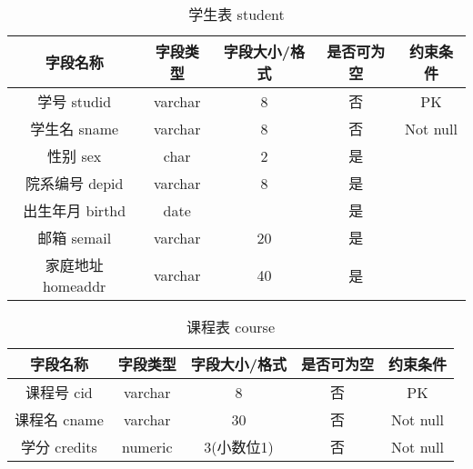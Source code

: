 \documentclass[a4paper]{uestcreport}
\begin{document}
\begin{table}[!h]
    \centering
    \caption{学生表 student}\label{tab:studentTable}%
    \begin{tabular}{|c|c|c|c|c|}
        \hline
        字段名称          & 字段类型 & 字段大小/格式 & 是否可为空 & 约束条件 \\
        \hline
        学号 studid       & varchar  & 8             & 否         & PK       \\
        \hline
        学生名 sname      & varchar  & 8             & 否         & Not null \\
        \hline
        性别 sex          & char     & 2             & 是         &          \\
        \hline
        院系编号 depid    & varchar  & 8             & 是         &          \\
        \hline
        出生年月 birthd   & date     &               & 是         &          \\
        \hline
        邮箱 semail       & varchar  & 20            & 是         &          \\
        \hline
        家庭地址 homeaddr & varchar  & 40            & 是         &          \\
        \hline
    \end{tabular}
\end{table}

\begin{table}[!h]
    \centering
    \caption{课程表 course}\label{tab:courseTable}%
    \begin{tabular}{|c|c|c|c|c|}
        \hline
        字段名称     & 字段类型 & 字段大小/格式 & 是否可为空 & 约束条件 \\
        \hline
        课程号 cid   & varchar  & 8             & 否         & PK       \\
        \hline
        课程名 cname & varchar  & 30            & 否         & Not null \\
        \hline
        学分 credits & numeric  & 3(小数位1)    & 否         & Not null \\
        \hline
    \end{tabular}
\end{table}
\end{document}
